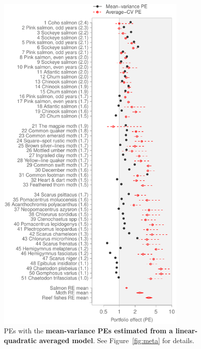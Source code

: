 \begin{figure}[htbp]
  \centering
  \includegraphics[height=6.8in]{prophets/PE_comparison_z_meta_taxa_lin_quad_avg_20121214.pdf}
  \caption{PEs with the \textbf{mean-variance PEs estimated from a
      linear-quadratic averaged model}. See Figure~\ref{fig:meta} for details.}
\label{fig:meta-lin-quad-avg}
\end{figure}

